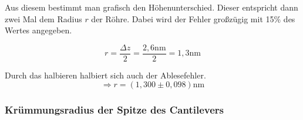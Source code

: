 Aus diesem bestimmt man grafisch den Höhenunterschied. Dieser entspricht dann zwei Mal dem Radius $r$ der Röhre. Dabei wird der Fehler 
großzügig mit 15\% des Wertes angegeben.

\begin{equation*}
   r = \frac{\Delta z}{2} = \frac{2,6\mathrm{nm}}{2} = 1,3\mathrm{nm}
\end{equation*}

Durch das halbieren halbiert sich auch der Ablesefehler. 
\begin{equation*}
    \Rightarrow r = (1,300 \pm 0,098)\mathrm{nm}
\end{equation*}


\subsubsection*{Krümmungsradius der Spitze des Cantilevers}